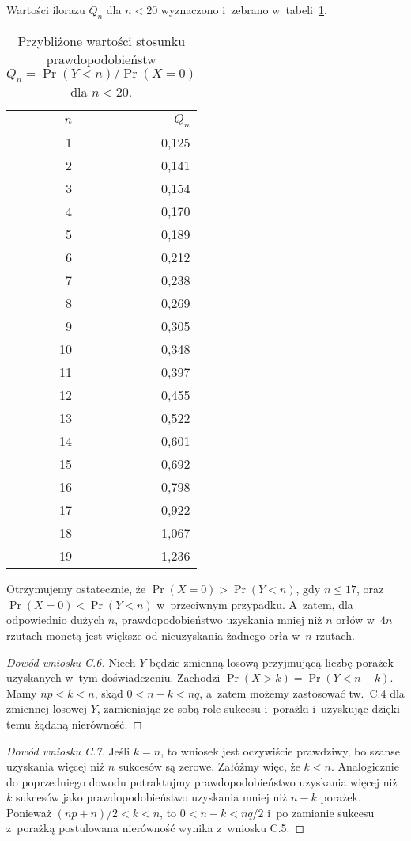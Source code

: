 Wartości ilorazu $Q_n$ dla $n<20$ wyznaczono i~zebrano w~tabeli~\ref{tab:C.5-1}.
\begin{table}[!ht]
	\centering
		\begin{tabular}{r|r}
			$n$ & $Q_n$ \\ \hline
			1 & 0{,}125 \\
			2 & 0{,}141 \\
			3 & 0{,}154 \\
			4 & 0{,}170 \\
			5 & 0{,}189 \\
			6 & 0{,}212 \\
			7 & 0{,}238 \\
			8 & 0{,}269 \\
			9 & 0{,}305 \\
			10 & 0{,}348 \\
			11 & 0{,}397 \\
			12 & 0{,}455 \\
			13 & 0{,}522 \\
			14 & 0{,}601 \\
			15 & 0{,}692 \\
			16 & 0{,}798 \\
			17 & 0{,}922 \\
			18 & 1{,}067 \\
			19 & 1{,}236
		\end{tabular}
		\caption{Przybliżone wartości stosunku prawdopodobieństw $Q_n=\Pr(Y<n)/\Pr(X=0)$ dla $n<20$.} \label{tab:C.5-1}
\end{table}
\noindent Otrzymujemy ostatecznie, że $\Pr(X=0)>\Pr(Y<n)$, gdy $n\le17$, oraz $\Pr(X=0)<\Pr(Y<n)$ w~przeciwnym przypadku.
A~zatem, dla odpowiednio dużych $n$, prawdopodobieństwo uzyskania mniej niż $n$ orłów w~$4n$ rzutach monetą jest większe od nieuzyskania żadnego orła w~$n$ rzutach.

\exercise %
\begin{proof}[Dowód wniosku C.6]
	Niech $Y$ będzie zmienną losową przyjmującą liczbę porażek uzyskanych w~tym doświadczeniu.
Zachodzi $\Pr(X>k)=\Pr(Y<n-k)$.
Mamy $np<k<n$, skąd $0<n-k<nq$, a~zatem możemy zastosować tw.\ C.4 dla zmiennej losowej $Y$, zamieniając ze sobą role sukcesu i~porażki i~uzyskując dzięki temu żądaną nierówność.
\end{proof}

\begin{proof}[Dowód wniosku C.7]
	Jeśli $k=n$, to wniosek jest oczywiście prawdziwy, bo szanse uzyskania więcej niż $n$ sukcesów są zerowe.
Załóżmy więc, że $k<n$.
Analogicznie do poprzedniego dowodu potraktujmy prawdopodobieństwo uzyskania więcej niż $k$ sukcesów jako prawdopodobieństwo uzyskania mniej niż $n-k$ porażek.
Ponieważ $(np+n)/2<k<n$, to $0<n-k<nq/2$ i~po zamianie sukcesu z~porażką postulowana nierówność wynika z~wniosku C.5.
\end{proof}

